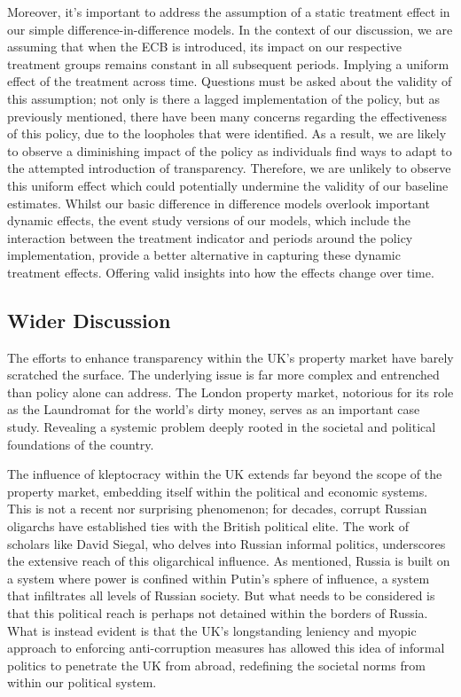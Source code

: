 \documentclass{article}
\begin{document}
Moreover, it's important to address the assumption of a static treatment effect in our simple difference-in-difference models. In the context of our discussion, we are assuming that when the ECB is introduced, its impact on our respective treatment groups remains constant in all subsequent periods. Implying a uniform effect of the treatment across time. Questions must be asked about the validity of this assumption; not only is there a lagged implementation of the policy, but as previously mentioned, there have been many concerns regarding the effectiveness of this policy, due to the loopholes that were identified. As a result, we are likely to observe a diminishing impact of the policy as individuals find ways to adapt to the attempted introduction of transparency. Therefore, we are unlikely to observe this uniform effect which could potentially undermine the validity of our baseline estimates. 
Whilst our basic difference in difference models overlook important dynamic effects, the event study versions of our models, which include the interaction between the treatment indicator and periods around the policy implementation, provide a better alternative in capturing these dynamic treatment effects. Offering valid insights into how the effects change over time.
 


\subsection{Wider Discussion}
The efforts to enhance transparency within the UK's property market have barely scratched the surface. The underlying issue is far more complex and entrenched than policy alone can address. The London property market, notorious for its role as the Laundromat for the world’s dirty money, serves as an important case study. Revealing a systemic problem deeply rooted in the societal and political foundations of the country.

The influence of kleptocracy within the UK extends far beyond the scope of the property market, embedding itself within the political and economic systems. This is not a recent nor surprising phenomenon; for decades, corrupt Russian oligarchs have established ties with the British political elite. The work of scholars like David Siegal, who delves into Russian informal politics, underscores the extensive reach of this oligarchical influence. As mentioned, Russia is built on a system where power is confined within Putin’s sphere of influence, a system that infiltrates all levels of Russian society. But what needs to be considered is that this political reach is perhaps not detained within the borders of Russia. What is instead evident is that the UK’s longstanding leniency and myopic approach to enforcing anti-corruption measures has allowed this idea of informal politics to penetrate the UK from abroad, redefining the societal norms from within our political system.
\end{document}

